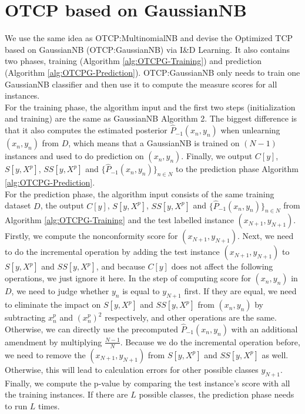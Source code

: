 \documentclass[10pt]{reportMaster}
\begin{document}
\section{OTCP based on GaussianNB}

We use the same idea as OTCP:MultinomialNB and devise the Optimized TCP based on GaussianNB (OTCP:GaussianNB) via I\&D Learning. It also contains two phases, training (Algorithm \ref{alg:OTCPG-Training}) and prediction (Algorithm \ref{alg:OTCPG-Prediction}). OTCP:GaussianNB only needs to train one GaussianNB classifier and then use it to compute the measure scores for all instances.\\

\noindent For the training phase, the algorithm input and the first two steps (initialization and training) are the same as GaussianNB Algorithm 2. The biggest difference is that it also computes the estimated posterior $\hat{P}_{-1}(x_n,y_n)$ when unlearning $(x_n,y_n)$ from $D$, which means that a GaussianNB is trained on $(N-1)$ instances and used to do prediction on $(x_n,y_n)$. Finally, we output $C[y]$, $S[y, X^p]$, $SS[y, X^p]$  and $\{\hat{P}_{-1}(x_n,y_n)\}_{n \in N}$ to the prediction phase Algorithm \ref{alg:OTCPG-Prediction}.\\

\noindent For the prediction phase, the algorithm input consists of the same training dataset $D$, the output $C[y]$, $S[y, X^p]$, $SS[y, X^p]$  and $\{\hat{P}_{-1}(x_n,y_n)\}_{n \in N}$ from Algorithm \ref{alg:OTCPG-Training} and the test labelled instance $(x_{N+1}, y_{N+1})$. Firstly, we compute the nonconformity score for $(x_{N+1}, y_{N+1})$. Next, we need to do the incremental operation by adding the test instance $(x_{N+1}, y_{N+1})$ to $S[y, X^p]$ and $SS[y, X^p]$, and because $C[y]$ does not affect the following operations, we just ignore it here. In the step of computing score for $(x_n,y_n)$ in $D$, we need to judge whether $y_n$ is equal to $y_{N+1}$ first. If they are equal, we need to eliminate the impact on $S[y, X^p]$ and $SS[y, X^p]$ from $(x_n,y_n)$ by subtracting $x_n^p$ and $(x_n^p)^2$ respectively, and other operations are the same. Otherwise, we can directly use the precomputed $\hat{P}_{-1}(x_n,y_n)$ with an additional amendment by multiplying $\frac{N-1}{N}$. Because we do the incremental operation before, we need to remove the $(x_{N+1}, y_{N+1})$ from $S[y, X^p]$ and $SS[y, X^p]$ as well. Otherwise, this will lead to calculation errors for other possible classes $y_{N+1}$. Finally, we compute the p-value by comparing the test instance's score with all the training instances. If there are $L$ possible classes, the prediction phase needs to run $L$ times.\\
\end{document}
